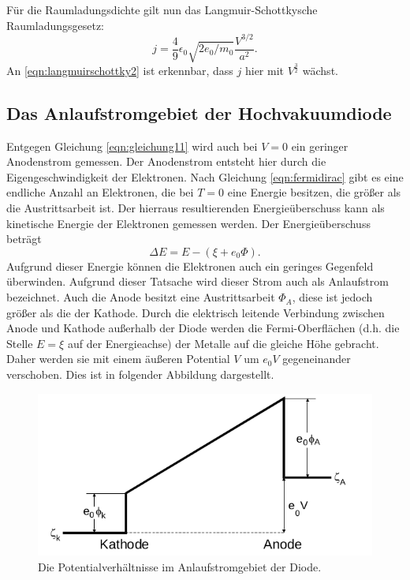 \noindent
Für die Raumladungsdichte gilt nun das Langmuir-Schottkysche Raumladungsgesetz:
\begin{equation}
  j = \frac{4}{9} \epsilon_0 \sqrt{2 e_0/m_0} \frac{V^{3/2}}{a^2}.
  \label{eqn:langmuirschottky2}
\end{equation}
An \eqref{eqn:langmuirschottky2} ist erkennbar, dass $j$ hier mit
$V^{\frac{3}{2}}$ wächst.

\subsection{Das Anlaufstromgebiet der Hochvakuumdiode}
Entgegen Gleichung \eqref{eqn:gleichung11} wird auch bei $V = 0$ ein
geringer Anodenstrom gemessen. Der Anodenstrom entsteht hier durch die
Eigengeschwindigkeit der Elektronen. Nach Gleichung \eqref{eqn:fermidirac} gibt
es eine endliche Anzahl an Elektronen, die bei $T = 0$ eine Energie besitzen,
die größer als die Austrittsarbeit ist. Der hierraus resultierenden
Energieüberschuss kann als kinetische Energie der Elektronen gemessen werden.
Der Energieüberschuss beträgt
\begin{equation}
  \Delta E = E - (\xi + e_0 \Phi).
  \label{eqn:energieübersch}
\end{equation}
Aufgrund dieser Energie können die Elektronen auch ein geringes Gegenfeld
überwinden. Aufgrund dieser Tatsache wird dieser Strom auch als
Anlaufstrom bezeichnet. Auch die Anode besitzt eine Austrittsarbeit $\Phi_A$, diese ist
jedoch größer als die der Kathode. Durch die elektrisch leitende Verbindung
zwischen Anode und Kathode außerhalb der Diode werden die Fermi-Oberflächen
(d.h. die Stelle $E = \xi$ auf der Energieachse) der Metalle auf die gleiche Höhe
gebracht. Daher werden sie mit einem äußeren Potential $V$ um $e_0 V$
gegeneinander verschoben. Dies ist in folgender Abbildung dargestellt.
\begin{figure}[H]
  \centering
  \includegraphics[scale=0.5]{content/anlaufstrompot.png}
  \caption{Die Potentialverhältnisse im Anlaufstromgebiet der Diode. \cite{AP01}}
  \label{fig:anlaufstrompot}
\end{figure}
